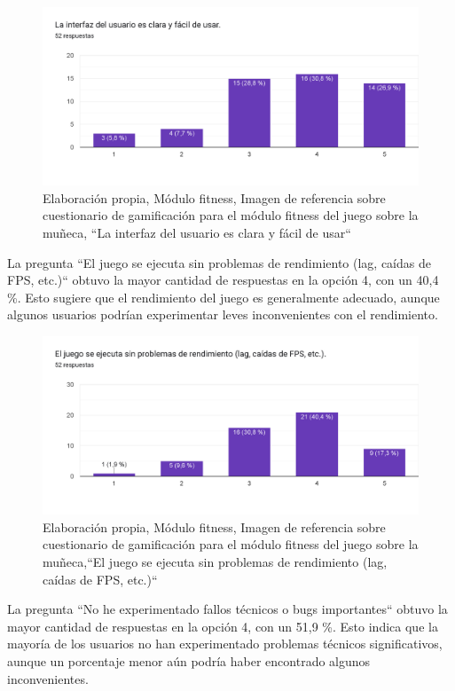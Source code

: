     \begin{figure}[H]
  \centering
  \includegraphics[width=0.7\linewidth]{Imagenes/fc6.png}
  \caption{Elaboración propia, Módulo fitness, Imagen de referencia sobre cuestionario  de gamificación para el módulo fitness del juego sobre la muñeca, ``La interfaz del usuario es clara y fácil de usar``}
  \label{fig:cuestionario6fitness}
\end{figure}


La pregunta ``El juego se ejecuta sin problemas de rendimiento (lag, caídas de FPS, etc.)`` obtuvo la mayor cantidad de respuestas en la opción 4, con un 40,4 \%. Esto sugiere que el rendimiento del juego es generalmente adecuado, aunque algunos usuarios podrían experimentar leves inconvenientes con el rendimiento.
    \begin{figure}[H]
  \centering
  \includegraphics[width=0.7\linewidth]{Imagenes/fc7.png}
  \caption{Elaboración propia, Módulo fitness, Imagen de referencia sobre cuestionario  de gamificación para el módulo fitness del juego sobre la muñeca,``El juego se ejecuta sin problemas de rendimiento (lag, caídas de FPS, etc.)`` }
  \label{fig:cuestionario7fitness}
\end{figure}


La pregunta ``No he experimentado fallos técnicos o bugs importantes`` obtuvo la mayor cantidad de respuestas en la opción 4, con un 51,9 \%. Esto indica que la mayoría de los usuarios no han experimentado problemas técnicos significativos, aunque un porcentaje menor aún podría haber encontrado algunos inconvenientes.

